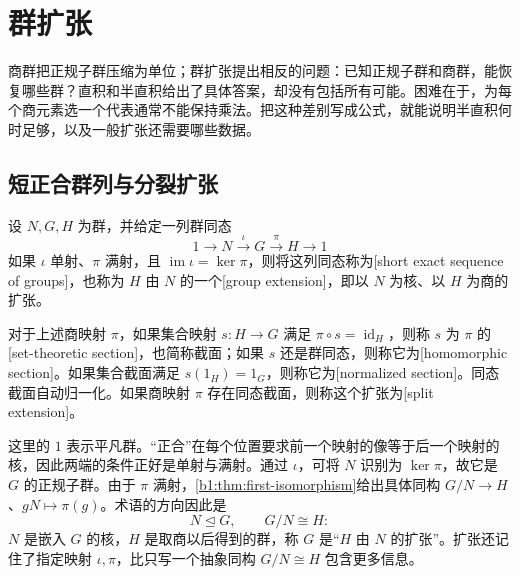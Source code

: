 
\section{群扩张}
\label{b1:sec:0603}

商群把正规子群压缩为单位；群扩张提出相反的问题：已知正规子群和商群，能恢复哪些群？直积和半直积给出了具体答案，却没有包括所有可能。困难在于，为每个商元素选一个代表通常不能保持乘法。把这种差别写成公式，就能说明半直积何时足够，以及一般扩张还需要哪些数据。


%
%

\subsection{短正合群列与分裂扩张}
\label{b1:subsec:0603:01}

\begin{definition}\label{b1:def:group-extension}
	设 \(N,G,H\) 为群，并给定一列群同态
	\[
		1\longrightarrow N\xrightarrow{\iota}G \xrightarrow{\pi}H\longrightarrow1
	\]
	如果 \(\iota\) 单射、\(\pi\) 满射，且 \(\operatorname{im}\iota=\ker\pi\)，则将这列同态称为[short exact sequence of groups]，也称为 \(H\) 由 \(N\) 的一个[group extension]，即以 \(N\) 为核、以 \(H\) 为商的扩张。

	对于上述商映射 \(\pi\)，如果集合映射 \(s:H\rightarrow G\) 满足 \(\pi\circ s=\operatorname{id}_H\)，则称 \(s\) 为 \(\pi\) 的[set-theoretic section]，也简称截面；如果 \(s\) 还是群同态，则称它为[homomorphic section]。如果集合截面满足 \(s(1_H)=1_G\)，则称它为[normalized section]。同态截面自动归一化。如果商映射 \(\pi\) 存在同态截面，则称这个扩张为[split extension]。
\end{definition}

这里的 \(1\) 表示平凡群。“正合”在每个位置要求前一个映射的像等于后一个映射的核，因此两端的条件正好是单射与满射。通过 \(\iota\)，可将 \(N\) 识别为 \(\ker\pi\)，故它是 \(G\) 的正规子群。由于 \(\pi\) 满射，\cref{b1:thm:first-isomorphism}给出具体同构 \(G/N\rightarrow H\)、\(gN\mapsto\pi(g)\)。术语的方向因此是
\[
	N\trianglelefteq G,\qquad G/N\cong H:
\]
\(N\) 是嵌入 \(G\) 的核，\(H\) 是取商以后得到的群，称 \(G\) 是“\(H\) 由 \(N\) 的扩张”。扩张还记住了指定映射 \(\iota,\pi\)，比只写一个抽象同构 \(G/N\cong H\) 包含更多信息。

